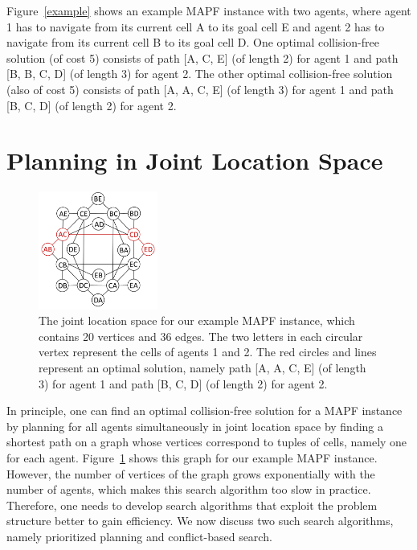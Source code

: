 \documentclass[11pt]{article}
\begin{document}
Figure~\ref{example} shows an example MAPF instance with two agents, where agent 1 has to navigate from its current cell A to its goal cell E and agent 2 has to navigate from its current cell B to its goal cell D. One optimal collision-free solution (of cost 5) consists of path [A, C, E] (of length 2) for agent 1 and path [B, B, C, D] (of length 3) for agent 2. The other optimal collision-free solution (also of cost 5) consists of path [A, A, C, E] (of length 3) for agent 1 and path [B, C, D] (of length 2) for agent 2.

\section{Planning in Joint Location Space}

\begin{figure}[ht]
\centering
\includegraphics[width=0.35\textwidth]{images/joint-space.png}
\caption{The joint location space for our example MAPF instance, which contains 20 vertices and 36 edges. The two letters in each circular vertex represent the cells of agents 1 and 2. The red circles and lines represent an optimal solution, namely path [A, A, C, E] (of length 3) for agent 1 and path [B, C, D] (of length 2) for agent 2. }\label{fig:joint-space}
\end{figure}

In principle, one can find an optimal collision-free solution for a MAPF instance by planning for all agents simultaneously in joint location space by finding a shortest path on a graph whose vertices correspond to tuples of cells, namely one for each agent. Figure~\ref{fig:joint-space} shows this graph for our example MAPF instance. However, the number of vertices of the graph grows exponentially with the number of agents, which makes this search algorithm too slow in practice. Therefore, one needs to develop search algorithms that exploit the problem structure better to gain efficiency. We now discuss two such search algorithms, namely prioritized planning and conflict-based search.
\end{document}
